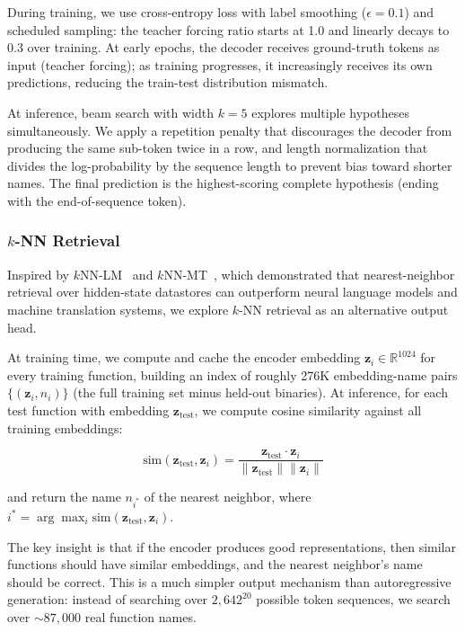 \documentclass[sigconf,nonacm]{acmart}
\begin{document}
During training, we use cross-entropy loss with label smoothing ($\epsilon{=}0.1$) and scheduled sampling: the teacher forcing ratio starts at 1.0 and linearly decays to 0.3 over training. At early epochs, the decoder receives ground-truth tokens as input (teacher forcing); as training progresses, it increasingly receives its own predictions, reducing the train-test distribution mismatch.

At inference, beam search with width $k{=}5$ explores multiple hypotheses simultaneously. We apply a repetition penalty that discourages the decoder from producing the same sub-token twice in a row, and length normalization that divides the log-probability by the sequence length to prevent bias toward shorter names. The final prediction is the highest-scoring complete hypothesis (ending with the end-of-sequence token).

\subsubsection{$k$-NN Retrieval}
\label{sec:knn}
Inspired by $k$NN-LM~\cite{knnlm} and $k$NN-MT~\cite{knnmt}, which demonstrated that nearest-neighbor retrieval over hidden-state datastores can outperform neural language models and machine translation systems, we explore $k$-NN retrieval as an alternative output head.

At training time, we compute and cache the encoder embedding $\mathbf{z}_i \in \mathbb{R}^{1024}$ for every training function, building an index of roughly 276K embedding-name pairs $\{(\mathbf{z}_i, n_i)\}$ (the full training set minus held-out binaries). At inference, for each test function with embedding $\mathbf{z}_\text{test}$, we compute cosine similarity against all training embeddings:

\begin{equation}
    \text{sim}(\mathbf{z}_\text{test}, \mathbf{z}_i) = \frac{\mathbf{z}_\text{test} \cdot \mathbf{z}_i}{\|\mathbf{z}_\text{test}\| \|\mathbf{z}_i\|}
\end{equation}

and return the name $n_{i^*}$ of the nearest neighbor, where $i^* = \arg\max_i \text{sim}(\mathbf{z}_\text{test}, \mathbf{z}_i)$.

The key insight is that if the encoder produces good representations, then similar functions should have similar embeddings, and the nearest neighbor's name should be correct. This is a much simpler output mechanism than autoregressive generation: instead of searching over $2{,}642^{20}$ possible token sequences, we search over ${\sim}87{,}000$ real function names.
\end{document}
